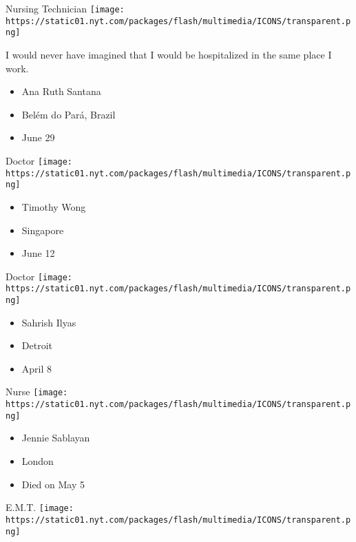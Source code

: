 \protect\hyperlink{item-ana-ruth-santana}{}

Nursing Technician
\texttt{[image: https://static01.nyt.com/packages/flash/multimedia/ICONS/transparent.png]}

I would never have imagined that I would be hospitalized in the same
place I work.

\begin{itemize}
\tightlist
\item
  Ana Ruth Santana
\item
  Belém do Pará, Brazil
\item
  June 29
\end{itemize}

\protect\hyperlink{item-timothy-wong}{}

Doctor
\texttt{[image: https://static01.nyt.com/packages/flash/multimedia/ICONS/transparent.png]}

\begin{itemize}
\tightlist
\item
  Timothy Wong
\item
  Singapore
\item
  June 12
\end{itemize}

\protect\hyperlink{item-sahrish-ilyas}{}

Doctor
\texttt{[image: https://static01.nyt.com/packages/flash/multimedia/ICONS/transparent.png]}

\begin{itemize}
\tightlist
\item
  Sahrish Ilyas
\item
  Detroit
\item
  April 8
\end{itemize}

\protect\hyperlink{item-jennie-sablayan}{}

Nurse
\texttt{[image: https://static01.nyt.com/packages/flash/multimedia/ICONS/transparent.png]}

\begin{itemize}
\tightlist
\item
  Jennie Sablayan
\item
  London
\item
  Died on May 5
\end{itemize}

\protect\hyperlink{item-courtney-bell}{}

E.M.T.
\texttt{[image: https://static01.nyt.com/packages/flash/multimedia/ICONS/transparent.png]}

